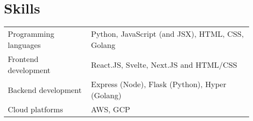 \documentclass[a4paper,11pt]{article}
\begin{document}
\section{Skills}
\begin{tabularx}{\linewidth}{@{}l X@{}}
Programming languages & \normalsize{Python, JavaScript (and JSX), HTML, CSS, Golang} \\
Frontend development &  \normalsize{React.JS, Svelte, Next.JS and HTML/CSS}\\
Backend development  &  \normalsize{ Express (Node), Flask (Python), Hyper (Golang) }\\  
Cloud platforms & \normalsize{ AWS, GCP } \\
\end{tabularx}

\vfill
{}
\end{document}
